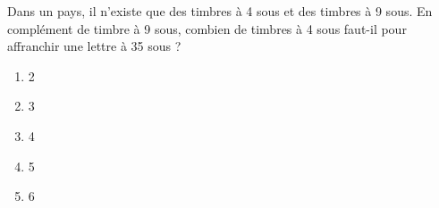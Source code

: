 Dans un pays, il n'existe que des timbres à 4 sous et des timbres à 9 sous. En complément de timbre à 9 sous, combien de timbres à 4 sous faut-il pour affranchir une lettre à 35 sous ?
\begin{multicols}{5}
  \begin{enumerate}[A/]
  \item 2
  \item 3
  \item 4
  \item 5
  \item 6
  \end{enumerate}
\end{multicols}
